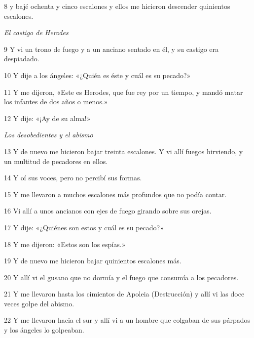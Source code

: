 \par 8 y bajé ochenta y cinco escalones y ellos me hicieron descender quinientos escalones.

\par \textit{El castigo de Herodes}

\par 9 Y vi un trono de fuego y a un anciano sentado en él, y su castigo era despiadado.

\par 10 Y dije a los ángeles: «¿Quién es éste y cuál es su pecado?»

\par 11 Y me dijeron, «Este es Herodes, que fue rey por un tiempo, y mandó matar los infantes de dos años o menos.»

\par 12 Y dije: «¡Ay de su alma!»

\par \textit{Los desobedientes y el abismo}

\par 13 Y de nuevo me hicieron bajar treinta escalones. Y vi allí fuegos hirviendo, y un multitud de pecadores en ellos.

\par 14 Y oí sus voces, pero no percibí sus formas.

\par 15 Y me llevaron a muchos escalones más profundos que no podía contar.

\par 16 Vi allí a unos ancianos con ejes de fuego girando sobre sus orejas.

\par 17 Y dije: «¿Quiénes son estos y cuál es su pecado?»

\par 18 Y me dijeron: «Estos son los espías.»

\par 19 Y de nuevo me hicieron bajar quinientos escalones más. 

\par 20 Y allí vi el gusano que no dormía y el fuego que consumía a los pecadores.

\par 21 Y me llevaron hasta los cimientos de Apoleia (Destrucción) y allí vi las doce veces golpe del abismo.

\par 22 Y me llevaron hacia el sur y allí vi a un hombre que colgaban de sus párpados y los ángeles lo golpeaban.

